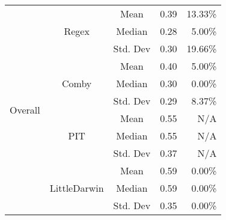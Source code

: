 \documentclass[sigconf,review, anonymous]{acmart}
\begin{document}
\begin{table}[htbp]
{\begin{tabular}{|c|c|r|r|r|r|}
\multirow{12}{*}{Overall} & \multirow{3}{*}{Regex} & \multicolumn{2}{c|}{Mean} & 0.39  & 13.33\%\\\cline{3-6}
    &   &  \multicolumn{2}{c|}{Median} & 0.28 & 5.00\% \\\cline{3-6}
    &   &  \multicolumn{2}{c|}{Std. Dev} & 0.30 & 19.66\% \\\cline{2-6}

 & \multirow{3}{*}{Comby} & \multicolumn{2}{c|}{Mean} & 0.40 & 5.00\%\\\cline{3-6}
    &   &  \multicolumn{2}{c|}{Median} & 0.30 & 0.00\% \\\cline{3-6}
    &   &  \multicolumn{2}{c|}{Std. Dev} & 0.29 & 8.37\%\\\cline{2-6}

 & \multirow{3}{*}{PIT} & \multicolumn{2}{c|}{Mean} & 0.55 & N/A\\\cline{3-6}
    &   &  \multicolumn{2}{c|}{Median} & 0.55 & N/A \\\cline{3-6}
    &   &  \multicolumn{2}{c|}{Std. Dev} & 0.37 & N/A \\\cline{2-6}
    
 & \multirow{3}{*}{LittleDarwin} & \multicolumn{2}{c|}{Mean} & 0.59 & 0.00\%\\\cline{3-6}
    &   &  \multicolumn{2}{c|}{Median} & 0.59 & 0.00\%\\\cline{3-6}
    &   &  \multicolumn{2}{c|}{Std. Dev} & 0.35 & 0.00\%\\ \hline
    
\end{tabular}
}
\end{table}




\end{document}
